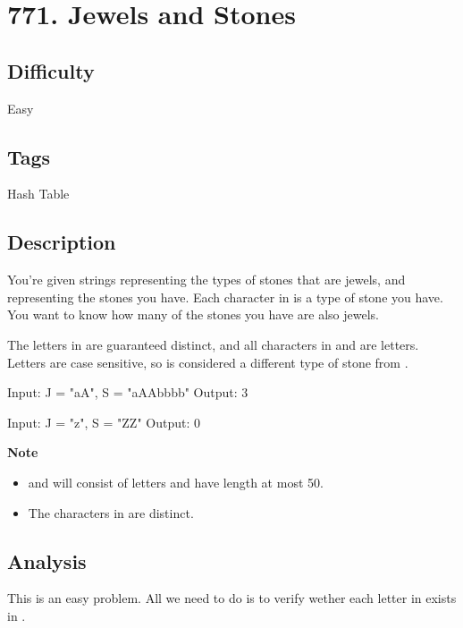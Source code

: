 \tocless\section{771. Jewels and Stones}
\label{algo:771}

\subsection*{Difficulty}
Easy

\subsection*{Tags}
Hash Table

\subsection*{Description}
You're given strings  representing the types of stones that are jewels, and  representing the stones you have. Each character in  is a type of stone you have. You want to know how many of the stones you have are also jewels.

The letters in  are guaranteed distinct, and all characters in  and  are letters. Letters are case sensitive, so  is considered a different type of stone from .

\begin{example}
\begin{multilinecode}
Input: J = "aA", S = "aAAbbbb"
Output: 3
\end{multilinecode}
\end{example}

\begin{example}
\begin{multilinecode}
Input: J = "z", S = "ZZ"
Output: 0
\end{multilinecode}
\end{example}

\textbf{Note}
\begin{itemize}
    \item {} and  will consist of letters and have length at most 50.
    \item The characters in  are distinct.
\end{itemize}

\subsection*{Analysis}
This is an easy problem. All we need to do is to verify wether each letter in  exists in .

